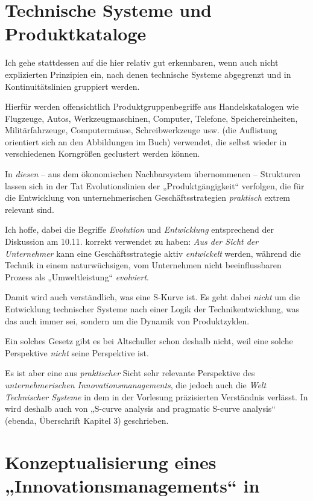 \documentclass[11pt,a4paper]{article}
\begin{document}
\section{Technische Systeme und Produktkataloge}

Ich gehe stattdessen auf die hier relativ gut erkennbaren, wenn auch nicht
explizierten Prinzipien ein, nach denen technische Systeme abgegrenzt und in
Kontinuitätslinien gruppiert werden.

Hierfür werden offensichtlich Produktgruppenbegriffe aus Handelskatalogen wie
Flugzeuge, Autos, Werkzeugmaschinen, Computer, Telefone, Speichereinheiten,
Militärfahrzeuge, Computermäuse, Schreibwerkzeuge usw. (die Auf\-listung
orientiert sich an den Abbildungen im Buch) verwendet, die selbst wieder in
verschiedenen Korngrößen geclustert werden können.

In \emph{diesen} -- aus dem ökonomischen Nachbarsystem übernommenen --
Strukturen lassen sich in der Tat Evolutionslinien der „Produktgängigkeit“
verfolgen, die für die Entwicklung von unternehmerischen Geschäftsstrategien
\emph{praktisch} extrem relevant sind.

Ich hoffe, dabei die Begriffe \emph{Evolution} und \emph{Entwicklung}
entsprechend der Diskussion am 10.11. korrekt verwendet zu haben: \emph{Aus
  der Sicht der Unternehmer} kann eine Geschäftsstrategie aktiv
\emph{entwickelt} werden, während die Technik in einem naturwüchsigen, vom
Unternehmen nicht beeinflussbaren Prozess als „Umweltleistung“
\emph{evolviert}.

Damit wird auch verständlich, was eine S-Kurve ist. Es geht dabei \emph{nicht}
um die Entwicklung technischer Systeme nach einer Logik der
Technikentwicklung, was das auch immer sei, sondern um die Dynamik von
Produktzyklen.

Ein solches Gesetz gibt es bei Altschuller schon deshalb nicht, weil eine
solche Perspektive \emph{nicht} seine Perspektive ist.

Es ist aber eine aus \emph{praktischer} Sicht sehr relevante Perspektive des
\emph{unternehmerischen Innovationsmanagements}, die jedoch auch die
\emph{Welt Technischer Systeme} in dem in der Vorlesung präzisierten
Verständnis verlässt.  In \cite{TESE2018} wird deshalb auch von „S-curve
analysis and pragmatic S-curve analysis“ (ebenda, Überschrift Kapitel 3)
geschrieben. 

\section{Konzeptualisierung eines „Innovationsmanagements“ in \cite{TESE2018}} 
\end{document}

